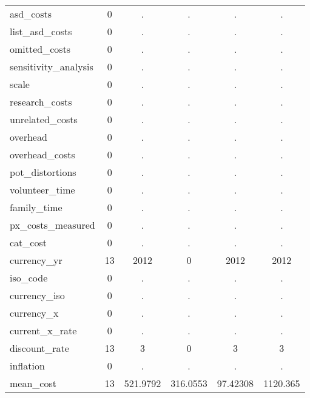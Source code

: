 \begin{table}[htbp]
\begin{tabular}{l*{1}{ccccc}}
asd\_costs   &           0&           .&           .&           .&           .\\
list\_asd\_costs&           0&           .&           .&           .&           .\\
omitted\_costs&           0&           .&           .&           .&           .\\
sensitivity\_analysis&           0&           .&           .&           .&           .\\
scale       &           0&           .&           .&           .&           .\\
research\_costs&           0&           .&           .&           .&           .\\
unrelated\_costs&           0&           .&           .&           .&           .\\
overhead    &           0&           .&           .&           .&           .\\
overhead\_costs&           0&           .&           .&           .&           .\\
pot\_distortions&           0&           .&           .&           .&           .\\
volunteer\_time&           0&           .&           .&           .&           .\\
family\_time &           0&           .&           .&           .&           .\\
px\_costs\_measured&           0&           .&           .&           .&           .\\
cat\_cost    &           0&           .&           .&           .&           .\\
currency\_yr &          13&        2012&           0&        2012&        2012\\
iso\_code    &           0&           .&           .&           .&           .\\
currency\_iso&           0&           .&           .&           .&           .\\
currency\_x  &           0&           .&           .&           .&           .\\
current\_x\_rate&           0&           .&           .&           .&           .\\
discount\_rate&          13&           3&           0&           3&           3\\
inflation   &           0&           .&           .&           .&           .\\
mean\_cost   &          13&    521.9792&    316.0553&    97.42308&    1120.365\\

\end{tabular}
\end{table}
